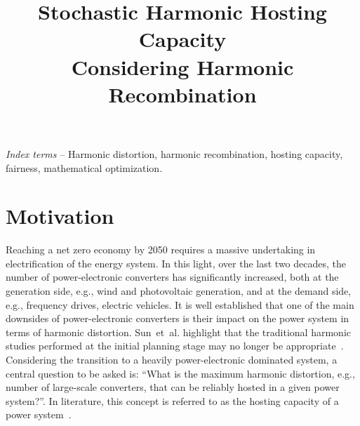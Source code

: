 \documentclass{IEEEtran4PSCC}
\begin{document}
\onecolumn

\title{Stochastic Harmonic Hosting Capacity \\ Considering Harmonic Recombination}

\author{
}

\maketitle

{\it Index terms} -- Harmonic distortion, harmonic recombination, hosting capacity, fairness, mathematical optimization.

\section{Motivation}
Reaching a net zero economy by 2050 requires a massive undertaking in electrification of the energy system. In this light, over the last two decades, the number of power-electronic converters has significantly increased, both at the generation side, e.g., wind and photovoltaic generation, and at the demand side, e.g., frequency drives, electric vehicles. It is well established that one of the main downsides of power-electronic converters is their impact on the power system in terms of harmonic distortion. Sun~et~al. highlight that the traditional harmonic studies performed at the initial planning stage may no longer be appropriate~\cite{sun_distribution_2022}. Considering the transition to a heavily power-electronic dominated system, a central question to be asked is: “What is the maximum harmonic distortion, e.g., number of large-scale converters, that can be reliably hosted in a given power system?”. In literature, this concept is referred to as the hosting capacity of a power system~\cite{bollen_hosting_2017}. 
\end{document}
